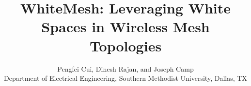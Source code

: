 \documentclass[10pt,conference]{IEEEtran}
\begin{document}
\title{WhiteMesh: Leveraging White Spaces in Wireless Mesh Topologies}
\author{ Pengfei Cui, Dinesh Rajan, and Joseph Camp\\ 
Department of Electrical Engineering, Southern Methodist University, Dallas, TX \\
}





\maketitle



%




%

%







\end{document}
